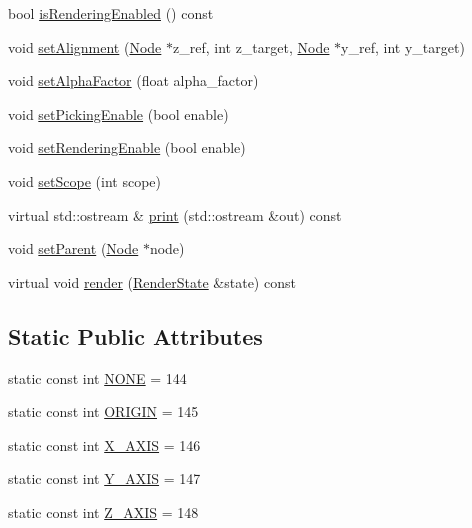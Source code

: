 \begin{CompactItemize}
bool \hyperlink{classm3g_1_1Node_95020b155afed9552cc55377b09b1e86}{isRenderingEnabled} () const 
\item 
void \hyperlink{classm3g_1_1Node_dd1627aba90e63c166ecd3d7463d735a}{setAlignment} (\hyperlink{classm3g_1_1Node}{Node} $\ast$z\_\-ref, int z\_\-target, \hyperlink{classm3g_1_1Node}{Node} $\ast$y\_\-ref, int y\_\-target)
\item 
void \hyperlink{classm3g_1_1Node_b33c321ce240770e5eb64d0e20ea61cc}{setAlphaFactor} (float alpha\_\-factor)
\item 
void \hyperlink{classm3g_1_1Node_4f9296202713ac56ccae72d5e0c21d96}{setPickingEnable} (bool enable)
\item 
void \hyperlink{classm3g_1_1Node_58981ef7aea1bf0e630bcc065b2987e9}{setRenderingEnable} (bool enable)
\item 
void \hyperlink{classm3g_1_1Node_55f324f307a01705b9094a73af4ecd68}{setScope} (int scope)
\item 
virtual std::ostream \& \hyperlink{classm3g_1_1Node_6fea17fa1532df3794f8cb39cb4f911f}{print} (std::ostream \&out) const 
\item 
void \hyperlink{classm3g_1_1Node_880ecc7c1c091f7607eeae12ed100a9a}{setParent} (\hyperlink{classm3g_1_1Node}{Node} $\ast$node)
\item 
virtual void \hyperlink{classm3g_1_1Node_8babc8a79b78615da51161e94029eea9}{render} (\hyperlink{structm3g_1_1RenderState}{RenderState} \&state) const 
\end{CompactItemize}
\subsection*{Static Public Attributes}
\begin{CompactItemize}
\item 
static const int \hyperlink{classm3g_1_1Node_7b20f1b443e093d5ec5e990e73b47232}{NONE} = 144
\item 
static const int \hyperlink{classm3g_1_1Node_1b0d56eb173868ff472a6fd296c5bb6c}{ORIGIN} = 145
\item 
static const int \hyperlink{classm3g_1_1Node_dd4bccb7b9c652e726d58b06bd28dab2}{X\_\-AXIS} = 146
\item 
static const int \hyperlink{classm3g_1_1Node_3248ff73b5411ab0a66a38c451c8b6fe}{Y\_\-AXIS} = 147
\item 
static const int \hyperlink{classm3g_1_1Node_a928e648c9ae9b4706937831f77f0c67}{Z\_\-AXIS} = 148
\end{CompactItemize}
